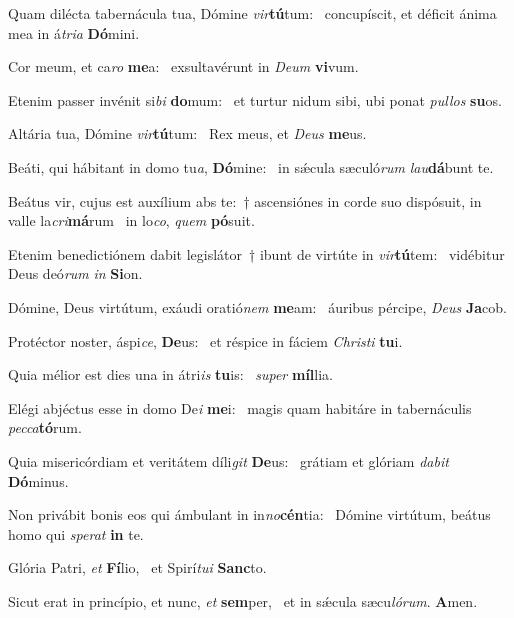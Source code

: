 \item Quam dilécta tabernácula tua, Dómine \textit{vir}\textbf{tú}tum:~\psstar{} concupíscit, et déficit ánima mea in á\textit{tria} \textbf{Dó}mini.
\item Cor meum, et ca\textit{ro} \textbf{me}a:~\psstar{} exsultavérunt in \textit{Deum} \textbf{vi}vum.
\item Etenim passer invénit si\textit{bi} \textbf{do}mum:~\psstar{} et turtur nidum sibi, ubi ponat \textit{pullos} \textbf{su}os.
\item Altária tua, Dómine \textit{vir}\textbf{tú}\-tum:~\psstar{} Rex meus, et \textit{Deus} \textbf{me}us.
\item Beáti, qui hábitant in domo tu\textit{a}, \textbf{Dó}mine:~\psstar{} in sǽcula sæculó\textit{rum} \textit{lau}\textbf{dá}bunt te.
\item Beátus vir, cujus est auxílium abs te:~† ascensiónes in corde suo dispósuit, in valle la\textit{cri}\textbf{má}rum~\psstar{} in lo\textit{co}, \textit{quem} \textbf{pó}suit.
\item Etenim benedictiónem dabit legislátor~† ibunt de virtúte in \textit{vir}\textbf{tú}tem:~\psstar{} vidébitur Deus deó\textit{rum} \textit{in} \textbf{Si}on.
\item Dómine, Deus virtútum, exáudi oratió\textit{nem} \textbf{me}am:~\psstar{} áuribus pércipe, \textit{Deus} \textbf{Ja}cob.
\item Protéctor noster, áspi\textit{ce}, \textbf{De}us:~\psstar{} et réspice in fáciem \textit{Christi} \textbf{tu}i.
\item Quia mélior est dies una in átri\textit{is} \textbf{tu}is:~\psstar{} \textit{super} \textbf{míl}lia.
\item Elégi abjéctus esse in domo De\textit{i} \textbf{me}i:~\psstar{} magis quam habitáre in tabernáculis \textit{pecca}\textbf{tó}rum.
\item Quia misericórdiam et veritátem díli\textit{git} \textbf{De}us:~\psstar{} grátiam et glóriam \textit{dabit} \textbf{Dó}minus.
\item Non privábit bonis eos qui ámbulant in in\textit{no}\textbf{cén}tia:~\psstar{} Dómine virtútum, beátus homo qui \textit{sperat} \textbf{in} te.
\item Glória Patri, \textit{et} \textbf{Fí}lio,~\psstar{} et Spirí\textit{tui} \textbf{Sanc}to.
\item Sicut erat in princípio, et nunc, \textit{et} \textbf{sem}per,~\psstar{} et in sǽcula sæcu\textit{lórum}. \textbf{A}men.